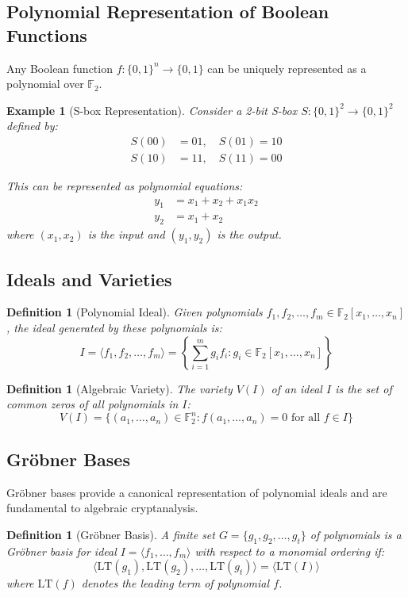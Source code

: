 \documentclass[12pt,a4paper]{article}
\newtheorem{definition}[theorem]{Definition}
\newtheorem{example}[theorem]{Example}
\newcommand{\GF}[1]{\mathbb{F}_{#1}}
\newcommand{\poly}[1]{\mathbb{F}_2[#1]}
\newcommand{\ideal}[1]{\langle #1 \rangle}
\newcommand{\Grobner}{Gr\"{o}bner}
\newcommand{\LT}{\text{LT}}
\begin{document}
\subsection{Polynomial Representation of Boolean Functions}

Any Boolean function $f: \{0,1\}^n \to \{0,1\}$ can be uniquely represented as a polynomial over $\GF{2}$.

\begin{example}[S-box Representation]
Consider a 2-bit S-box $S: \{0,1\}^2 \to \{0,1\}^2$ defined by:
\begin{align}
S(00) &= 01, \quad S(01) = 10 \\
S(10) &= 11, \quad S(11) = 00
\end{align}

This can be represented as polynomial equations:
\begin{align}
y_1 &= x_1 + x_2 + x_1 x_2 \\
y_2 &= x_1 + x_2
\end{align}
where $(x_1, x_2)$ is the input and $(y_1, y_2)$ is the output.
\end{example}

\subsection{Ideals and Varieties}

\begin{definition}[Polynomial Ideal]
Given polynomials $f_1, f_2, \ldots, f_m \in \poly{x_1, \ldots, x_n}$, the ideal generated by these polynomials is:
$$I = \ideal{f_1, f_2, \ldots, f_m} = \left\{\sum_{i=1}^m g_i f_i : g_i \in \poly{x_1, \ldots, x_n}\right\}$$
\end{definition}

\begin{definition}[Algebraic Variety]
The variety $V(I)$ of an ideal $I$ is the set of common zeros of all polynomials in $I$:
$$V(I) = \{(a_1, \ldots, a_n) \in \GF{2}^n : f(a_1, \ldots, a_n) = 0 \text{ for all } f \in I\}$$
\end{definition}

\subsection{\Grobner{} Bases}

\Grobner{} bases provide a canonical representation of polynomial ideals and are fundamental to algebraic cryptanalysis.

\begin{definition}[\Grobner{} Basis]
A finite set $G = \{g_1, g_2, \ldots, g_t\}$ of polynomials is a \Grobner{} basis for ideal $I = \ideal{f_1, \ldots, f_m}$ with respect to a monomial ordering if:
$$\ideal{\LT(g_1), \LT(g_2), \ldots, \LT(g_t)} = \ideal{\LT(I)}$$
where $\LT(f)$ denotes the leading term of polynomial $f$.
\end{definition}
\end{document}
